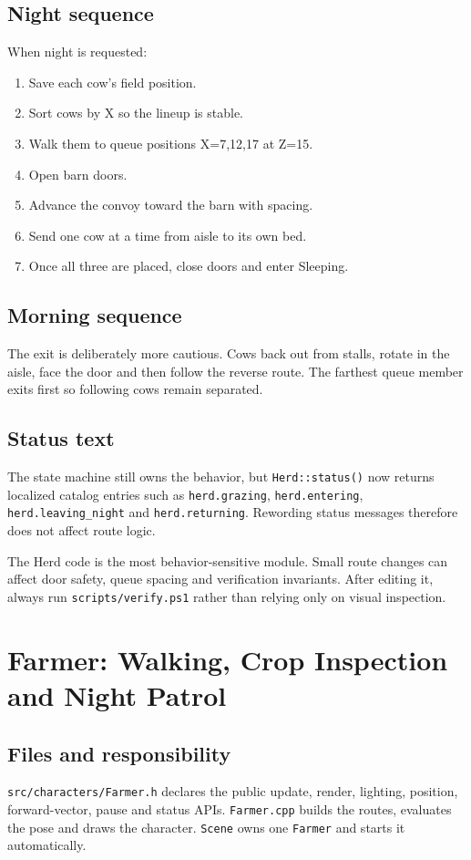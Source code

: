 \documentclass[11pt,a4paper,openany]{book}
\newcommand{\code}[1]{\texttt{#1}}
\newcommand{\file}[1]{\nolinkurl{#1}}
\begin{document}
\section{Night sequence}
When night is requested:
\begin{enumerate}
	\item Save each cow's field position.
	\item Sort cows by X so the lineup is stable.
	\item Walk them to queue positions X=7,12,17 at Z=15.
	\item Open barn doors.
	\item Advance the convoy toward the barn with spacing.
	\item Send one cow at a time from aisle to its own bed.
	\item Once all three are placed, close doors and enter Sleeping.
\end{enumerate}

\section{Morning sequence}
The exit is deliberately more cautious. Cows back out from stalls, rotate in the aisle, face the door and then follow the reverse route. The farthest queue member exits first so following cows remain separated.

\section{Status text}
The state machine still owns the behavior, but \code{Herd::status()} now returns localized catalog entries such as \code{herd.grazing}, \code{herd.entering}, \code{herd.leaving_night} and \code{herd.returning}. Rewording status messages therefore does not affect route logic.

\begin{warningbox}
	The Herd code is the most behavior-sensitive module. Small route changes can affect door safety, queue spacing and verification invariants. After editing it, always run \file{scripts/verify.ps1} rather than relying only on visual inspection.
\end{warningbox}

\chapter[Farmer: Walking and Night Patrol]{Farmer: Walking, Crop Inspection and Night Patrol}
\label{ch:farmer}
\section{Files and responsibility}
\file{src/characters/Farmer.h} declares the public update, render, lighting, position, forward-vector, pause and status APIs. \file{Farmer.cpp} builds the routes, evaluates the pose and draws the character. \code{Scene} owns one \code{Farmer} and starts it automatically.
\end{document}
